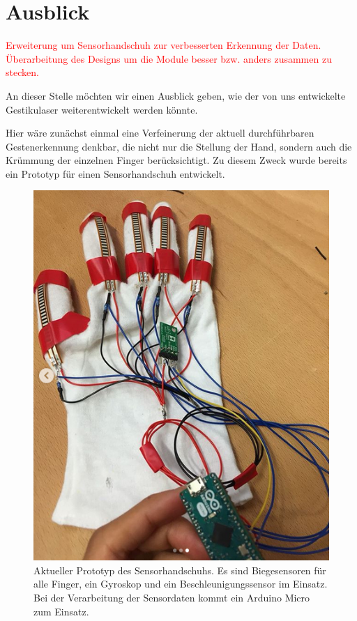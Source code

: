 \chapter{Ausblick}
\label{ch:Ausblick}

\textcolor{red}{Erweiterung um Sensorhandschuh zur verbesserten Erkennung der Daten. Überarbeitung des Designs um die Module besser bzw. anders zusammen zu stecken.}

An dieser Stelle möchten wir einen Ausblick geben, wie der von uns entwickelte Gestikulaser  weiterentwickelt werden könnte. 

Hier wäre zunächst einmal eine Verfeinerung der aktuell durchführbaren Gestenerkennung denkbar, die nicht nur die Stellung der Hand, sondern auch die Krümmung der einzelnen Finger berücksichtigt. Zu diesem Zweck wurde bereits ein Prototyp für einen Sensorhandschuh entwickelt. 

\begin{figure}[h]
	\centering
	\includegraphics[scale=0.75]{figures/Sensorhandschuh}
	\caption{Aktueller Prototyp des Sensorhandschuhs. Es sind Biegesensoren für alle Finger, ein Gyroskop und ein Beschleunigungssensor im Einsatz. Bei der  
	Verarbeitung der Sensordaten kommt ein Arduino Micro zum Einsatz.}
	\label{fig:}
\end{figure}

